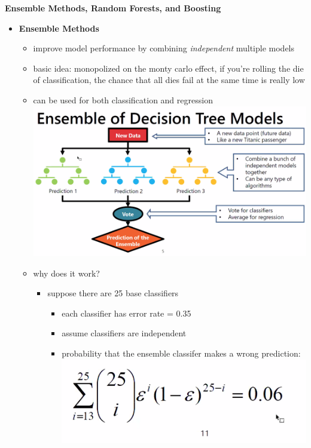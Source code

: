 \documentclass[12pt]{article}
\begin{document}
	\newpage \vfill
	\textbf{\centering Ensemble Methods, Random Forests, and Boosting}
	\begin{itemize}
		\item \textbf{Ensemble Methods}
		\begin{itemize}
			\item improve model performance by combining \textit {independent} multiple models
			\item basic idea: monopolized on the monty carlo effect, if you're rolling the die of classification, the chance that all dies fail at the same time is really low
			\item can be used for both classification and regression \newline
			{\centering \includegraphics[scale=.5]{ensemble.png}}
			\item why does it work?
			\begin{itemize}
				\item suppose there are 25 base classifiers 
				\begin{itemize}
					\item each classifier has error rate = 0.35
					\item assume classifiers are independent 
					\item probability that the ensemble classifer makes a wrong prediction: \newline
					{\centering \includegraphics[scale=.5]{prediction.png}}

\end{itemize}
\end{itemize}
\end{itemize}
\end{itemize}
\end{document}
